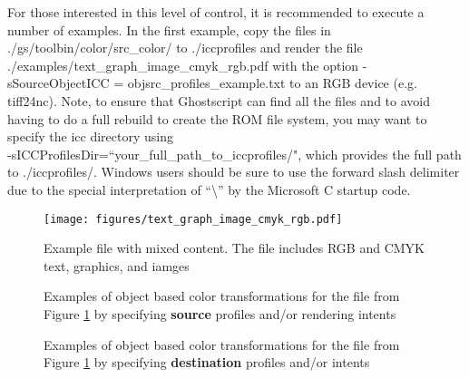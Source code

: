 \documentclass[12pt,notitlepage]{article}
\begin{document}
For those interested in this level of control, it is recommended to execute a number of examples.
In the first example, copy the files in ./gs/toolbin/color/src\_color/ to ./iccprofiles and render the file ./examples/text\_graph\_image\_cmyk\_rgb.pdf with the option -sSourceObjectICC = objsrc\_profiles\_example.txt to an RGB device (e.g. tiff24nc).  Note, to ensure that Ghostscript can find all the files and to avoid having to do a full rebuild to create the ROM file system, you may want to specify the icc directory using\\
 -sICCProfilesDir=``your\_full\_path\_to\_iccprofiles/", which provides the full path to ./iccprofiles/.   Windows users should be sure to use the forward slash delimiter due to the special interpretation of ``\textbackslash'' by the Microsoft C startup code.

\begin{figure}
    \begin{center}
\texttt{[image: figures/text\_graph\_image\_cmyk\_rgb.pdf]}
    \end{center}
   \caption{Example file with mixed content. The file includes RGB and CMYK text, graphics, and iamges}
    \label{fig:normal}
\end{figure}

\begin{figure}
    \caption{Examples of object based color transformations for the file from Figure \ref{fig:normal} by specifying {\bf source} profiles and/or rendering intents}
\end{figure}

\begin{figure}
    \caption{Examples of object based color transformations for the file from Figure \ref{fig:normal} by specifying {\bf destination} profiles and/or intents}
  \label{fig:object_based_color}
\end{figure}
\end{document}
